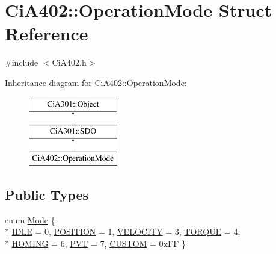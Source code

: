 \hypertarget{struct_ci_a402_1_1_operation_mode}{}\section{Ci\+A402\+:\+:Operation\+Mode Struct Reference}
\label{struct_ci_a402_1_1_operation_mode}


{\ttfamily \#include $<$Ci\+A402.\+h$>$}

Inheritance diagram for Ci\+A402\+:\+:Operation\+Mode\+:\begin{figure}[H]
\begin{center}
\leavevmode
\includegraphics[height=3.000000cm]{dc/d80/struct_ci_a402_1_1_operation_mode}
\end{center}
\end{figure}
\subsection*{Public Types}
\begin{DoxyCompactItemize}
\item 
enum \hyperlink{struct_ci_a402_1_1_operation_mode_a0f19a6a20de54376f05e373ae42d39ba}{Mode} \{ \\*
\hyperlink{struct_ci_a402_1_1_operation_mode_a0f19a6a20de54376f05e373ae42d39baa6e0631b7a5c3c137e64a63f82e2d48fb}{I\+D\+L\+E} = 0, 
\hyperlink{struct_ci_a402_1_1_operation_mode_a0f19a6a20de54376f05e373ae42d39baaf7802cbda9a0a95f499c7da732229364}{P\+O\+S\+I\+T\+I\+O\+N} = 1, 
\hyperlink{struct_ci_a402_1_1_operation_mode_a0f19a6a20de54376f05e373ae42d39baac74e1cd4b8ee7c27ecf54a9f1233d4b5}{V\+E\+L\+O\+C\+I\+T\+Y} = 3, 
\hyperlink{struct_ci_a402_1_1_operation_mode_a0f19a6a20de54376f05e373ae42d39baaed391d5568bcc4f501bb6f51526500b9}{T\+O\+R\+Q\+U\+E} = 4, 
\\*
\hyperlink{struct_ci_a402_1_1_operation_mode_a0f19a6a20de54376f05e373ae42d39baa27f35fd6002ca49d9027f221f3010cf6}{H\+O\+M\+I\+N\+G} = 6, 
\hyperlink{struct_ci_a402_1_1_operation_mode_a0f19a6a20de54376f05e373ae42d39baa78df9f85a4912faaf130fdbf49b6b292}{P\+V\+T} = 7, 
\hyperlink{struct_ci_a402_1_1_operation_mode_a0f19a6a20de54376f05e373ae42d39baadd55f5e98b68f126e0e9e28c6219cbb8}{C\+U\+S\+T\+O\+M} = 0x\+F\+F
 \}
\end{DoxyCompactItemize}
